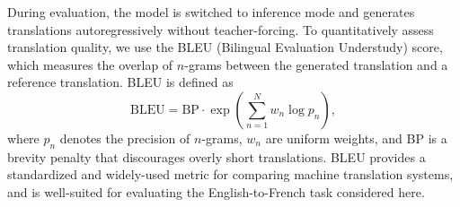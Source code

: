 During evaluation, the model is switched to inference mode
and generates translations autoregressively without
teacher-forcing.
To quantitatively assess translation quality, we use the
BLEU (Bilingual Evaluation Understudy) score, which measures
the overlap of $n$-grams between the generated translation
and a reference translation.
BLEU is defined as
\begin{equation}
\text{BLEU} = \text{BP} \cdot \exp\left( \sum_{n=1}^{N} w_n \log p_n \right),
\end{equation}
where $p_n$ denotes the precision of $n$-grams, $w_n$ are
uniform weights, and BP is a brevity penalty that discourages
overly short translations.
BLEU provides a standardized and widely-used metric for
comparing machine translation systems, and is well-suited
for evaluating the English-to-French task considered here.
